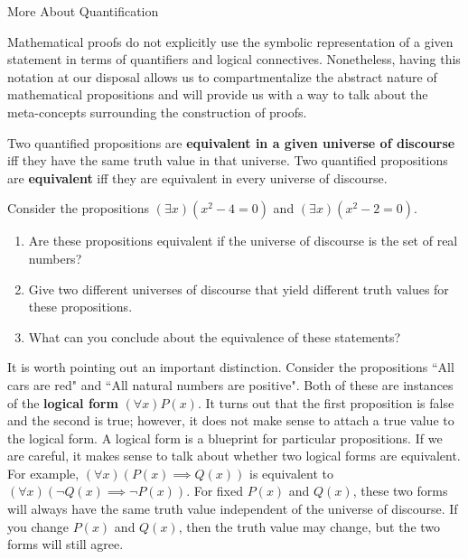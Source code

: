\begin{section}{More About Quantification}

Mathematical proofs do not explicitly use the symbolic representation of a given statement in terms of quantifiers and logical connectives.  Nonetheless, having this notation at our disposal allows us to compartmentalize the abstract nature of mathematical propositions and will provide us with a way to talk about the meta-concepts surrounding the construction of proofs.

\begin{definition}
Two quantified propositions are \textbf{equivalent in a given universe of discourse} iff they have the same truth value in that universe.  Two quantified propositions are \textbf{equivalent} iff they are equivalent in every universe of discourse.
\end{definition}

\begin{exercise}
Consider the propositions $(\exists x)(x^2-4=0)$ and $(\exists x)(x^2-2=0)$.  
\begin{enumerate}[label=\textrm{(\alph*)}]
\item Are these propositions equivalent if the universe of discourse is the set of real numbers?
\item Give two different universes of discourse that yield different truth values for these propositions.  
\item What can you conclude about the equivalence of these statements?
\end{enumerate}
\end{exercise}

It is worth pointing out an important distinction.  Consider the propositions ``All cars are red" and ``All natural numbers are positive".  Both of these are instances of the \textbf{logical form} $(\forall x)P(x)$.  It turns out that the first proposition is false and the second is true; however, it does not make sense to attach a true value to the logical form.  A logical form is a blueprint for particular propositions.  If we are careful, it makes sense to talk about whether two logical forms are equivalent.  For example, $(\forall x)(P(x)\implies Q(x))$ is equivalent to $(\forall x)(\neg Q(x)\implies \neg P(x))$.  For fixed $P(x)$ and $Q(x)$, these two forms will always have the same truth value independent of the universe of discourse.  If you change $P(x)$ and $Q(x)$, then the truth value may change, but the two forms will still agree.


\end{section}
